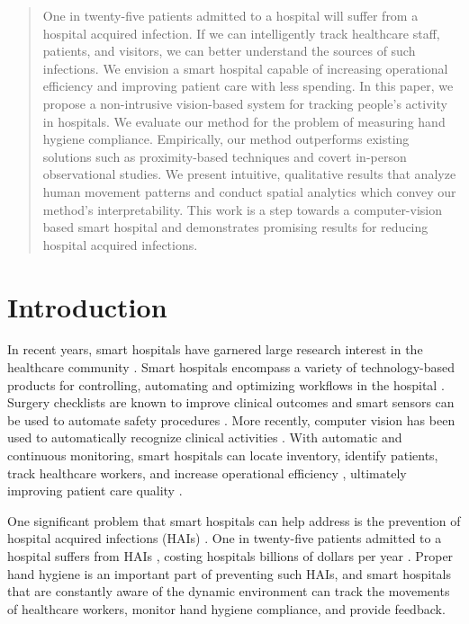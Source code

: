 \documentclass[twoside,11pt]{article}
\begin{document}
\begin{abstract}
One in twenty-five patients admitted to a hospital will suffer from a hospital acquired infection.
If we can intelligently track healthcare staff, patients, and visitors, we can better understand the sources of such infections.
We envision a smart hospital capable of increasing operational efficiency and improving patient care with less spending.
In this paper, we propose a non-intrusive vision-based system for tracking people's activity in hospitals. We evaluate our method for the problem of measuring hand hygiene compliance.
Empirically, our method outperforms existing solutions such as proximity-based techniques and covert in-person observational studies.
We present intuitive, qualitative results that analyze human movement patterns and conduct spatial analytics which convey our method's interpretability. 
This work is a step towards a computer-vision based smart hospital and demonstrates promising results for reducing hospital acquired infections.
\end{abstract}


\section{Introduction}
In recent years, smart hospitals have garnered large research interest in the healthcare community \citep{ma2017measuring, twinanda2015data, chakraborty2013video, sanchez2008activity, weiser2010effect, fisher2008tracking}.
Smart hospitals encompass a variety of technology-based products for controlling, automating and optimizing workflows in the hospital \citep{sanchez2008activity, chakraborty2013video}. 
Surgery checklists are known to improve clinical outcomes \citep{weiser2010effect} and smart sensors can be used to automate safety procedures \citep{yu2012smart}.
More recently, computer vision has been used to automatically recognize clinical activities \citep{chakraborty2013video, ma2017measuring, twinanda2015data}.
With automatic and continuous monitoring, smart hospitals can locate inventory, identify patients, track healthcare workers, and increase operational efficiency \citep{fisher2008tracking, lenz2007support}, ultimately improving patient care quality \citep{gao2006vital}.

One significant problem that smart hospitals can help address is the prevention of hospital acquired infections (HAIs) \citep{cook2009assessing}.
One in twenty-five patients admitted to a hospital suffers from HAIs \citep{cdc2016}, costing hospitals billions of dollars per year \citep{zimlichman2013health}. Proper hand hygiene is an important part of preventing such HAIs, and smart hospitals that are constantly aware of the dynamic environment can track the movements of healthcare workers, monitor hand hygiene compliance, and provide feedback.
\end{document}
